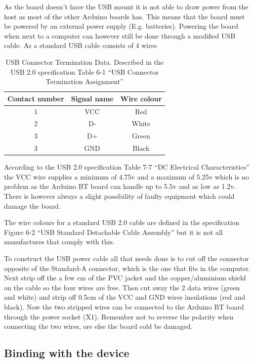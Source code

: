 \documentclass[a4paper, oneside, final]{memoir}
\begin{document}
As the board doesn't have the USB mount it is not able to draw power from the
host as most of the other Arduino boards has. This means that the board must be
powered by an external power supply (E.g. batteries). Powering the board when
next to a computer can however still be done through a modified USB cable. As a
standard USB cable consists of 4 wires

\begin{table}[h!]
  \centering
  \begin{tabular}{|c|c|c|}
    \hline
    Contact number & Signal name & Wire colour \\ \hline
    1 & VCC & Red \\ \hline
    2 & D- & White \\ \hline
    3 & D+ & Green \\ \hline
    3 & GND & Black \\ \hline
  \end{tabular}
  \caption{USB Connector Termination Data. Described in the USB 2.0
    specification\cite{usb20} Table 6-1 ``USB Connector Termination Assignment''}
  \label{tab:ArduinoBT:Connector_Termination_Data}
\end{table}

According to the USB 2.0 specification\cite{usb20} Table 7-7 ``DC Electrical
Characteristics'' the VCC wire supplies a minimum of 4.75v and a maximum of
5.25v which is no problem as the Arduino BT board can handle up to 5.5v and as
low as 1.2v. There is however always a slight possibility of faulty equipment
which could damage the board.

The wire colours for a standard USB 2.0 cable are defined in the
specification\cite{usb20} Figure 6-2 ``USB Standard Detachable Cable Assembly''
but it is not all manufactures that comply with this.

To construct the USB power cable all that needs done is to cut off the connector
opposite of the Standard-A connector, which is the one that fits in the
computer. Next strip off the a few cm of the PVC jacket and the copper/aluminium
shield on the cable so the four wires are free. Then cut away the 2 data wires
(green and white) and strip off 0.5cm of the VCC and GND wires insulations (red
and black). Now the two stripped wires can be connected to the Arduino BT board
through the power socket (X1). Remember not to reverse the polarity when
connecting the two wires, ore else the board cold be damaged.

\subsection{Binding with the device}
\end{document}
